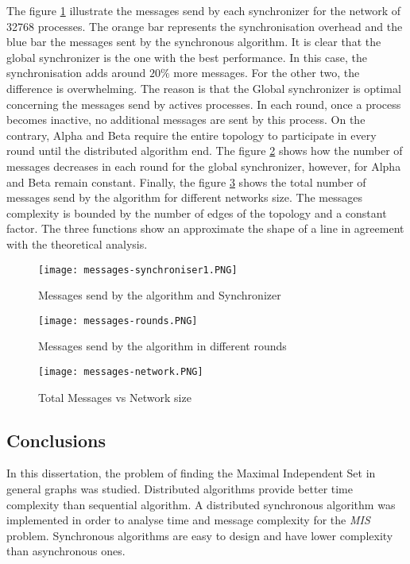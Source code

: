 The figure \ref{fig:total_msg} illustrate the messages send by each synchronizer for the network of 32768 processes. The orange bar represents the synchronisation overhead and the blue bar the messages sent by the synchronous algorithm. It is clear that the global synchronizer is the one with the best performance. In this case, the synchronisation adds around $20 \%$ more messages. For the other two, the difference is overwhelming. The reason is that the Global synchronizer is optimal concerning the messages send by actives processes. In each round, once a process becomes inactive, no additional messages are sent by this process. On the contrary, Alpha and Beta require the entire topology to participate in every round until the distributed algorithm end.  The figure \ref{fig:total_msg-round} shows how the number of messages decreases in each round for the global synchronizer, however, for Alpha and Beta remain constant. Finally, the figure \ref{fig:total_msg-size} shows the total number of messages send by the algorithm for different networks size. The messages complexity is bounded by the number of edges of the topology and a constant factor. The three functions show an approximate the shape of a line in agreement with the theoretical analysis.





\begin{figure}[ht]
\centering
\texttt{[image: messages-synchroniser1.PNG]} 
\caption{Messages send by the algorithm and Synchronizer}
\label{fig:total_msg}
\end{figure}

\begin{figure}[ht]
\centering
\texttt{[image: messages-rounds.PNG]} 
\caption{Messages send by the algorithm in different rounds}
\label{fig:total_msg-round}
\end{figure}

\begin{figure}[ht]
\centering
\texttt{[image: messages-network.PNG]} 
\caption{Total Messages vs Network size}
\label{fig:total_msg-size}
\end{figure}


\subsection{Conclusions}

In this dissertation, the problem of finding the Maximal Independent Set in general graphs was studied. Distributed algorithms provide better time complexity than sequential algorithm.  A distributed synchronous algorithm was implemented in order to analyse time and message complexity for the \textit{MIS} problem. Synchronous algorithms are easy to design and have lower complexity than asynchronous ones.

\newpage
